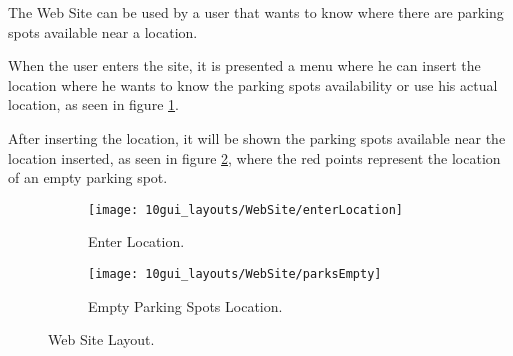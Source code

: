 The Web Site can be used by a user that wants to know where there are parking spots available near a location. 

When the user enters the site, it is presented a menu where he can insert the location where he wants to know the parking spots availability or use his actual location, as seen in figure \ref{fig:enterLocation}.


After inserting the location, it will be shown the parking spots available near the location inserted, as seen in figure \ref{fig:parksEmpty}, where the red points represent the location of an empty parking spot.


\begin{figure}[H]
	\centering
	\begin{subfigure}{.5\textwidth}
		\centering
		\texttt{[image: 10gui\_layouts/WebSite/enterLocation]}
		\caption{Enter Location.}
		\label{fig:enterLocation}
	\end{subfigure}%
	\begin{subfigure}{.5\textwidth}
		\centering
		\texttt{[image: 10gui\_layouts/WebSite/parksEmpty]}
		\caption{Empty Parking Spots Location.}
		\label{fig:parksEmpty}
	\end{subfigure}
	\caption{Web Site Layout.}
	\label{fig:webSite}
\end{figure}